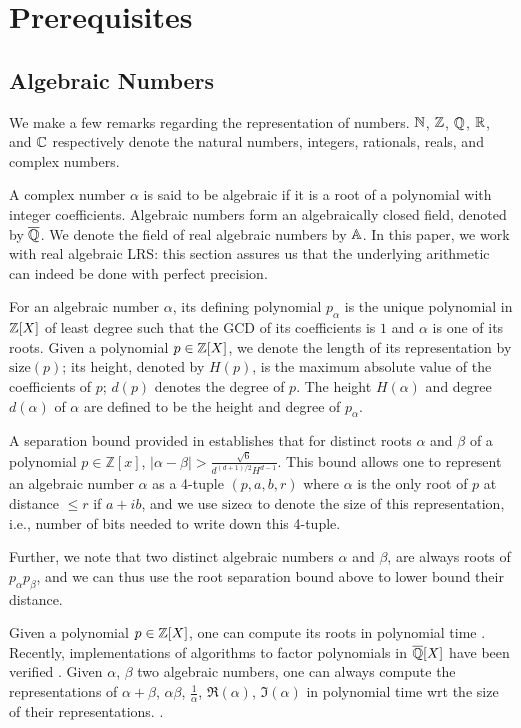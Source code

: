\section{Prerequisites}
\label{section:prelims}
\subsection{Algebraic Numbers}
We make a few remarks regarding the representation of numbers. $\mathbb{N}$, $\mathbb{Z}$, $\mathbb{Q}$, $\mathbb{R}$, and $\mathbb{C}$ respectively denote the natural numbers, integers, rationals, reals, and complex numbers. 

A complex number $\alpha$ is said to be algebraic if it is a root of a polynomial with integer coefficients. Algebraic numbers form an algebraically closed field, denoted by $\overline{\mathbb{Q}}$. We denote the field of real algebraic numbers by $\mathbb{A}$. In this paper, we work with real algebraic LRS: this section assures us that the underlying arithmetic can indeed be done with perfect precision.

For an algebraic number $\alpha$, its defining polynomial $p_\alpha$ is the unique polynomial in $\mathbb{Z}[X]$ of least degree such that the GCD of its coefficients is $1$ and $\alpha$ is one of its roots.
Given a polynomial $p \in \mathbb{Z}[X]$, we denote the length of its representation by $\text{size}(p)$; its height, denoted by $H(p)$, is the maximum absolute value of the coefficients of $p$; $d(p)$ denotes the degree of $p$. The height $H(\alpha)$ and degree $d(\alpha)$ of $\alpha$ are defined to be the height and degree of $p_\alpha$.

A separation bound provided in \cite{mignottecon} establishes that for distinct roots $\alpha$ and $\beta$ of a polynomial $p \in \mathbb{Z}[x]$,
$|\alpha - \beta| > \frac{\sqrt{6}}{d^{(d+1)/2}H^{d-1}}$.
This bound allows one to represent an algebraic number $\alpha$ as a 4-tuple $(p,a,b,r)$ where $\alpha$ is the only root of $p$ at distance $\leq r$ if $a+ib$, and we use $\text{size}{\alpha}$ to denote the size of this representation, i.e., number of bits needed to write down this 4-tuple.

Further, we note that two distinct algebraic numbers $\alpha$ and $\beta$, are always roots of $p_\alpha p_\beta$, and we can thus use the root separation bound above to lower bound their distance.

Given a polynomial $p\in \mathbb{Z}[X]$, one can compute its roots in polynomial time \cite{findroots1operate1}. Recently, implementations of algorithms to factor polynomials in $\overline{\mathbb{Q}}[X]$ have been verified \cite{factor-algebraic}. Given $\alpha$, $\beta$ two algebraic numbers, one can always compute the representations of $\alpha+\beta$, $\alpha\beta$, $\frac 1 \alpha$, $\Re(\alpha)$, $\Im(\alpha)$ in polynomial time wrt the size of their representations. \cite{findroots1operate1,findroots2operate2}.

